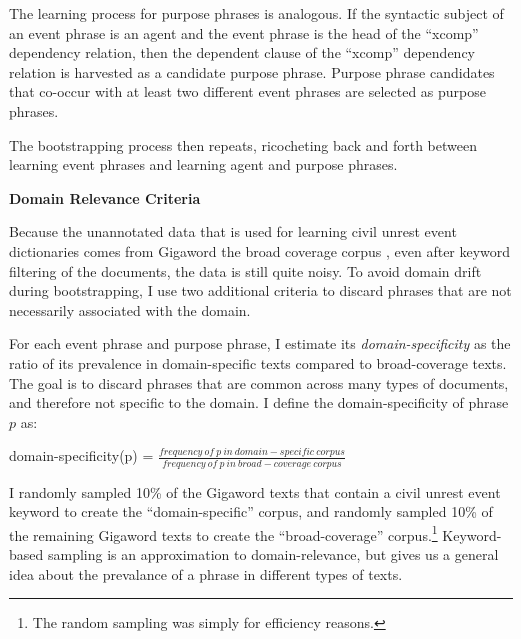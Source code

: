 The learning process for purpose phrases is analogous. If the
syntactic subject of an event phrase is an agent and the event phrase is the head
of the ``xcomp'' dependency relation, then the dependent clause of the ``xcomp''
dependency relation is harvested as a candidate purpose phrase.  Purpose
phrase candidates that co-occur with at least two different event
phrases 
are selected as purpose phrases.

The bootstrapping process then repeats, ricocheting back and forth
between learning event phrases and learning agent and purpose
phrases.

\vspace{.1in}
\textbf{Domain Relevance Criteria}
\vspace{.1in}

Because the unannotated data that is used for learning 
civil unrest event dictionaries 
comes from Gigaword the broad coverage corpus \cite{Gigaword}, 
even after keyword filtering of the documents, 
the data is still quite noisy.
To avoid domain drift during bootstrapping, I use two additional
criteria to discard phrases that are not necessarily associated
with the domain.

For each event phrase and purpose phrase, I estimate its {\it
  domain-specificity} as the ratio of its prevalence in
domain-specific texts compared to broad-coverage texts. The goal is to
discard phrases that are common across many types of documents, and
therefore not specific to the domain. I define the
domain-specificity of phrase $p$ as:


\begin{center}
{\small  domain-specificity(p) = $\frac {frequency~of~p~in~domain-specific~corpus}{frequency~of~p~in~broad-coverage~corpus}$}
\end{center}

I randomly sampled 10\% of the Gigaword texts that contain a civil
unrest event keyword to create the ``domain-specific'' corpus, and 
randomly sampled 10\% of the remaining Gigaword texts 
to create the ``broad-coverage''
corpus.\footnote{The random sampling was simply for efficiency
  reasons.} Keyword-based sampling is an approximation to
domain-relevance, but gives us a general idea about the prevalance of
a phrase in different types of texts.

